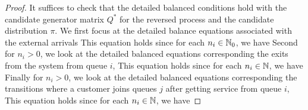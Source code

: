 \documentclass[a4paper,10pt,english]{article}
\begin{document}
\begin{proof} 
It suffices to check that the detailed balanced conditions hold with the candidate generator matrix $Q^{\ast}$ for the reversed process and the candidate distribution $\pi$. 
We first focus at the detailed balance equations associated with the external arrivals 
This equation holds since for each $n_i \in \mathbb{N}_0$, we have 
Second for $n_i > 0$, we look at the detailed balanced equations corresponding the exits from the system from queue $i$,
This equation holds since for each $n_i \in \mathbb{N}$, we have 
Finally for $n_i > 0$, we look at the detailed balanced equations corresponding the transitions where a customer joins queues $j$ after getting service from queue $i$,
This equation holds since for each $n_i \in \mathbb{N}$, we have 
\end{proof}
\end{document}

